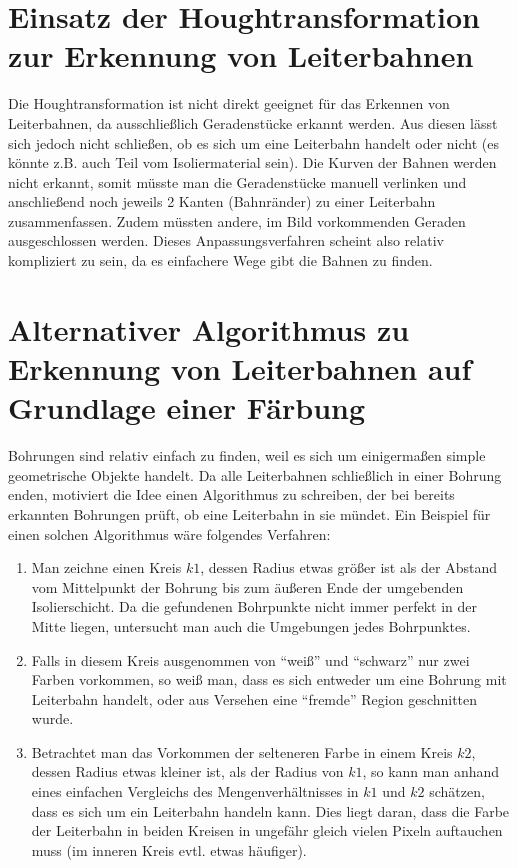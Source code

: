 \section{Einsatz der Houghtransformation zur Erkennung von Leiterbahnen}
Die Houghtransformation ist nicht direkt geeignet für das Erkennen von Leiterbahnen, da ausschließlich Geradenstücke erkannt werden. Aus diesen lässt sich jedoch nicht schließen, ob es sich um eine Leiterbahn handelt oder nicht (es könnte z.B. auch Teil vom Isoliermaterial sein). \newline
Die Kurven der Bahnen werden nicht erkannt, somit müsste man die Geradenstücke manuell verlinken und anschließend noch jeweils 2 Kanten (Bahnränder) zu einer Leiterbahn zusammenfassen. Zudem müssten andere, im Bild vorkommenden Geraden ausgeschlossen werden. \newline
Dieses Anpassungsverfahren scheint also relativ kompliziert zu sein, da es einfachere Wege gibt die Bahnen zu finden.  

\section{Alternativer Algorithmus zu Erkennung von Leiterbahnen auf Grundlage einer Färbung}
Bohrungen sind relativ einfach zu finden, weil es sich um einigermaßen simple geometrische Objekte handelt. Da alle Leiterbahnen schließlich in einer Bohrung enden, motiviert die Idee einen Algorithmus zu schreiben, der bei bereits erkannten Bohrungen prüft, ob eine Leiterbahn in sie mündet.\newline
Ein Beispiel für einen solchen Algorithmus wäre folgendes Verfahren: \newline
\begin{enumerate}
\item Man zeichne einen Kreis $k1$, dessen Radius etwas größer ist als der Abstand vom Mittelpunkt der Bohrung bis zum äußeren Ende der umgebenden Isolierschicht. \newline
Da die gefundenen Bohrpunkte nicht immer perfekt in der Mitte liegen, untersucht man auch die Umgebungen jedes Bohrpunktes.
\item Falls in diesem Kreis ausgenommen von "`weiß"' und "`schwarz"' nur zwei Farben vorkommen, so weiß man, dass es sich entweder um eine Bohrung mit Leiterbahn handelt, oder aus Versehen eine "`fremde"' Region geschnitten wurde. 
\item Betrachtet man das Vorkommen der selteneren Farbe in einem Kreis $k2$, dessen Radius etwas kleiner ist, als der Radius von $k1$, so kann man anhand eines einfachen Vergleichs des Mengenverhältnisses in $k1$ und $k2$ schätzen, dass es sich um ein Leiterbahn handeln kann. \newline
Dies liegt daran, dass die Farbe der Leiterbahn in beiden Kreisen in ungefähr gleich vielen Pixeln auftauchen muss (im inneren Kreis evtl. etwas häufiger).
\end{enumerate}

